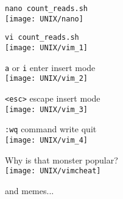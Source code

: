 \documentclass[xcolor=dvipsnames]{beamer}
\begin{document}
\begin{frame}[fragile]
	\begin{center}
		\Large
		\verb!nano count_reads.sh! \\
		\vspace{1cm}
		\texttt{[image: UNIX/nano]}
	\end{center}
\end{frame}	

\begin{frame}[fragile]
	\begin{center}
		\Large
		\verb!vi count_reads.sh! \\
		\vspace{1cm}
		\texttt{[image: UNIX/vim\_1]}
	\end{center}
\end{frame}

\begin{frame}[fragile]
	\begin{center}
		\Large
		\verb!a! or \verb!i! enter insert mode \\
		\vspace{1cm}
		\texttt{[image: UNIX/vim\_2]}
	\end{center}
\end{frame}

\begin{frame}[fragile]
	\begin{center}
		\Large
		\verb!<esc>! escape insert mode\\
		\vspace{1cm}
		\texttt{[image: UNIX/vim\_3]}
	\end{center}
\end{frame}

\begin{frame}[fragile]
	\begin{center}
		\Large
		\verb!:wq! command write quit\\
		\vspace{1cm}
		\texttt{[image: UNIX/vim\_4]}
	\end{center}
\end{frame}

\begin{frame}
	\begin{center}
		\Huge
		Why is that monster popular?\\
		\vspace{1cm}
		\texttt{[image: UNIX/vimcheat]}
	\end{center}
	\hfill and memes...
\end{frame}	
\end{document}

